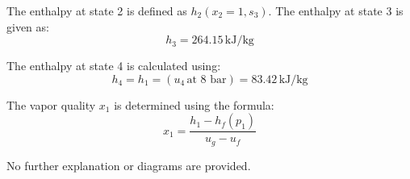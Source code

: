 The enthalpy at state 2 is defined as \( h_2(x_2 = 1, s_3) \).  
The enthalpy at state 3 is given as:  
\[
h_3 = 264.15 \, \text{kJ/kg}
\]  

The enthalpy at state 4 is calculated using:  
\[
h_4 = h_1 = (u_4 \, \text{at 8 bar}) = 83.42 \, \text{kJ/kg}
\]  

The vapor quality \( x_1 \) is determined using the formula:  
\[
x_1 = \frac{h_1 - h_f(p_1)}{u_g - u_f}
\]  

No further explanation or diagrams are provided.